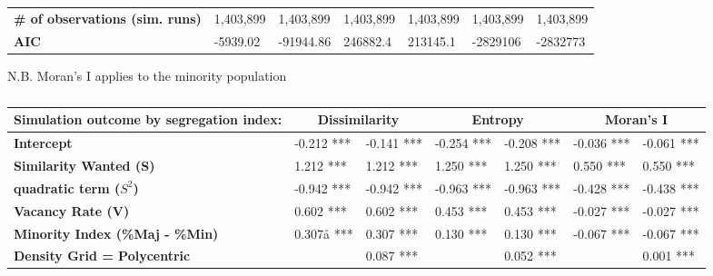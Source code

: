 \documentclass[Royal,sageh,times]{sagej}
\begin{document}
\begin{table}[]
\begin{adjustwidth}{-0.5cm}{-0.5cm}
\begin{tabular}{|m{2.5cm}|ll|ll|ll|}
\textbf{\# of observations (sim. runs)}     & 1,403,899  & {\color[HTML]{000000} 1,403,899} & 1,403,899         & 1,403,899         & 1,403,899            & 1,403,899                \\ 
\textbf{AIC}                                & -5939.02   & -91944.86                        & 246882.4          & 213145.1          & -2829106             & -2832773                 \\ \hline
\end{tabular}
\end{adjustwidth}
N.B. Moran's I applies to the minority population
\end{table}





\begin{table}[]
\centering
\caption{}
\begin{adjustwidth}{-0.5cm}{-0.5cm}
\begin{tabular}{|m{2.5cm}|ll|ll|ll|}
\hline
Simulation outcome by segregation index:    & \multicolumn{2}{c|}{\textbf{Dissimilarity}}   & \multicolumn{2}{c|}{\textbf{Entropy}} & \multicolumn{2}{c|}{\textbf{Moran's I}} \\ \hline
\textbf{Intercept}                          & -0.212 *** & -0.141 ***                       & -0.254 ***        & -0.208 ***        & -0.036 ***           & -0.061 ***               \\ \hline
\textbf{Similarity Wanted (S)}              & 1.212 ***  & 1.212 ***                        & 1.250 ***         & 1.250 ***         & 0.550 ***            & 0.550 ***                \\ 
\textbf{quadratic term ($S^2$)}               & -0.942 *** & -0.942 ***                       & -0.963 ***        & -0.963 ***        & -0.428 ***           & -0.438 ***               \\ 
\textbf{Vacancy Rate (V)}                   & 0.602 ***  & 0.602 ***                        & 0.453 ***         & 0.453 ***         & -0.027 ***           & -0.027 ***               \\ 
\textbf{Minority Index (\%Maj - \%Min)}     & 0.307å ***  & 0.307 ***                        & 0.130 ***         & 0.130 ***         & -0.067 ***           & -0.067 ***               \\ \hline
\textbf{Density Grid = Polycentric}         &            & 0.087 ***                        &                   & 0.052 ***         &                      & 0.001 ***                \\ 

\end{tabular}
\end{adjustwidth}
\end{table}
\end{document}
